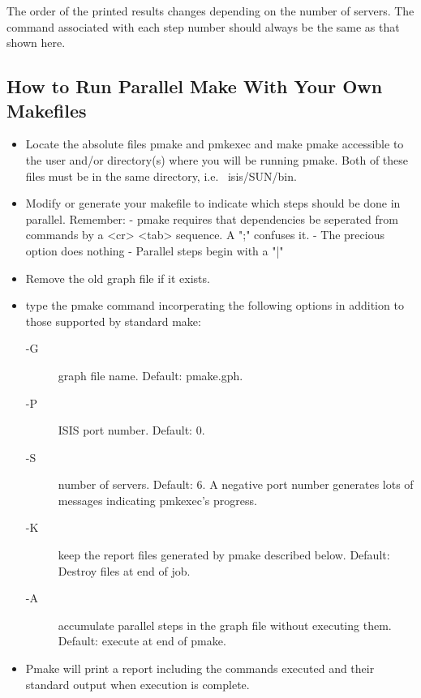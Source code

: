 The order of the printed results changes depending on the number of servers.
The command associated with each step number should always be the same as that 
shown here.


\subsection*{How to Run Parallel Make With Your Own Makefiles}
\begin{itemize}

\item Locate the absolute files pmake and pmkexec and make pmake accessible to
     the user and/or directory(s) where you will be running pmake.  Both of
     these files must be in the same directory, i.e. ~isis/SUN/bin.

\item Modify or generate your makefile to indicate which steps should be done
     in parallel.  Remember:
       - pmake requires that dependencies be seperated from commands by a
         <cr> <tab> sequence.  A ";" confuses it.
       - The precious option does nothing
       - Parallel steps begin with a "|"

\item Remove the old graph file if it exists.

\item type the pmake command incorperating the following options in addition to
     those supported by standard make:
\begin{description}
\item[-G] graph file name.  Default: pmake.gph.
\item[-P] ISIS port number. Default: 0.
\item[-S] number of servers. Default: 6.
             A negative port number generates lots of messages indicating
             pmkexec's progress.
\item[-K] keep the report files generated by pmake described below.
             Default: Destroy files at end of job.
\item[-A] accumulate parallel steps in the graph file without executing them.
             Default: execute at end of pmake.
\end{description}

\item Pmake will print a report including the commands executed and their
     standard output when execution is complete.


\end{itemize}
